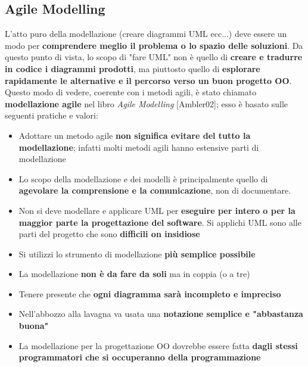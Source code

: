\documentclass[12pt]{article}
\begin{document}
\subsection{Agile Modelling}
L'atto puro della modellazione (creare diagrammi UML ecc...) deve essere un modo per \textbf{comprendere meglio il problema o lo spazio delle soluzioni}.
Da questo punto di vista, lo scopo di "fare UML" non è quello di \textbf{creare e tradurre in codice i diagrammi prodotti}, ma piuttosto quello di \textbf{esplorare rapidamente le alternative e il percorso verso un buon progetto OO}.
Questo modo di vedere, coerente con i metodi agili, è stato chiamato \textbf{modellazione agile} nel libro \textit{Agile Modelling} [Ambler02]; esso è basato sulle seguenti pratiche e valori:
\begin{itemize}
    \item Adottare un metodo agile \textbf{non significa evitare del tutto la modellazione}; infatti molti metodi agili hanno estensive parti di modellazione
    \item Lo scopo della modellazione e dei modelli è principalmente quello di \textbf{agevolare la comprensione e la comunicazione}, non di documentare.
    \item Non si deve modellare e applicare UML per \textbf{eseguire per intero o per la maggior parte la progettazione del software}. Si applichi UML sono alle parti del progetto che sono \textbf{difficili on insidiose}
    \item Si utilizzi lo strumento di modellazione \textbf{più semplice possibile}
    \item La modellazione \textbf{non è da fare da soli} ma in coppia (o a tre)
    \item Tenere presente che \textbf{ogni diagramma sarà incompleto e impreciso}
    \item Nell'abbozzo alla lavagna va usata una \textbf{notazione semplice e "abbastanza buona"}
    \item La modellazione per la progettazione OO dovrebbe essere fatta \textbf{dagli stessi programmatori che si occuperanno della programmazione}
\end{itemize}
\end{document}
